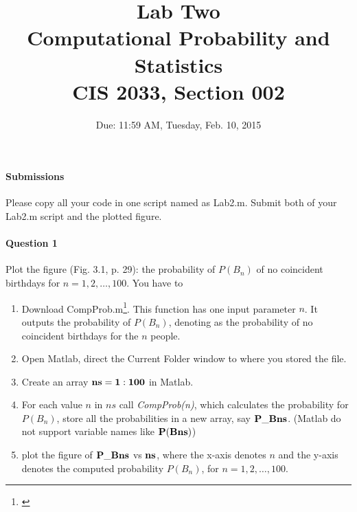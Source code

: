 \documentclass[11pt]{article} %
\title{Lab Two\\
Computational Probability and Statistics \\
CIS 2033, Section 002}
\author{Due: 11:59 AM, Tuesday, Feb. 10, 2015}
\date{} %
\begin{document}
\maketitle

\paragraph*{\bf Submissions} Please copy all your code in one script named as Lab2.m. Submit both of your Lab2.m script and the plotted figure. 

\paragraph*{Question 1}
Plot the figure (Fig. 3.1, p. 29): the probability of $P(B_n)$ of no coincident birthdays for $n=1, 2, \ldots, 100$. You have to 
\begin{enumerate}
\item Download CompProb.m\footnote{\href{http://nymph332088.github.io/CIS2033/2033/Labs/02/Questions/CompProb.m}{}}. This function has one input parameter $n$. It outputs the probability of $P(B_n)$, denoting as the probability of no coincident birthdays for the $n$ people.
\item Open Matlab, direct the Current Folder window to where you stored the file. 
\item Create an array $\bf ns = 1:100$ in Matlab.
\item For each value $n$ in $ns$ call {\it CompProb(n)}, which calculates the probability for $P(B_n)$, store all the probabilities in a new array, say $\bf P\_Bns$. (Matlab do not support variable names like $\bf P(Bns)$)
\item plot the figure of $\bf P\_Bns$ vs $\bf ns$, where the x-axis denotes $n$ and the y-axis denotes the computed probability $P(B_n)$, for $n = 1, 2, \ldots, 100$.
\end{enumerate}
\end{document}
